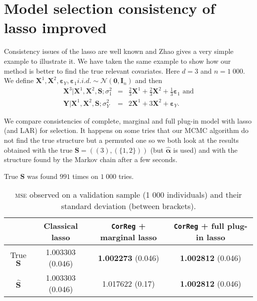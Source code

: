 \documentclass[12pt,a4paper]{report}
\begin{document}
	\section{Model selection consistency of {\sc lasso} improved}\label{consistency}
		Consistency issues of the {\sc lasso} are well known and Zhao \cite{Zhao2006MSC} gives a very simple example to illustrate it.
		We have taken the same example to show how our method is better to find the true relevant covariates.
		Here $d=3$ and $n=1\;000$.\\
		We define $\boldsymbol{X}^1,\boldsymbol{X}^2, \boldsymbol{\varepsilon}_Y, \boldsymbol{\varepsilon}_{1} i.i.d. \sim \mathcal{N}(\boldsymbol{0},\boldsymbol{I}_n)$ and then \\
		\begin{eqnarray}
		\boldsymbol{X}^3|\boldsymbol{X}^1,\boldsymbol{X}^2,\boldsymbol{S};\sigma_1^2&=&\frac{2}{3}\boldsymbol{X}^1+\frac{2}{3}\boldsymbol{X}^2+\frac{1}{3}\boldsymbol{\varepsilon}_1 \textrm{ and}  \nonumber \\
		\boldsymbol{Y}|\boldsymbol{X}^1,\boldsymbol{X}^2,\boldsymbol{S};\sigma_Y^2&=&2\boldsymbol{X}^1+3\boldsymbol{X}^2+\boldsymbol{\varepsilon}_Y. \nonumber 
		\end{eqnarray}
		
		
		We compare consistencies of complete, marginal and full plug-in model with {\sc lasso} (and LAR) for selection.
		It happens on some tries that our MCMC algorithm do not find the true structure but a permuted one so we both look at the results obtained with the true $\boldsymbol{S}=((3),(\{1,2\}))$ (but $\hat{\boldsymbol{\alpha}}$ is used) and with the structure found by the Markov chain after a few seconds.
		
		True $\boldsymbol{S}$ was found $991$ times on $1\;000$ tries.%
		
		\begin{table}[h!]
		\centering
		\begin{tabular}{|c|c|c|c|}
		\hline 
		 & Classical {\sc lasso} & {\tt CorReg} + marginal {\sc lasso}& {\tt CorReg} + full plug-in {\sc lasso}\\ 
		\hline 
		True $\boldsymbol{S}$ &  1.003303 (0.046) & \textbf{1.002273} (0.046)& \textbf{1.002812} (0.046)\\ 
		\hline 
		$\hat{\boldsymbol{S}}$ & 1.003303 (0.046)& 1.017622 (0.17)& \textbf{1.002812} (0.046)\\ 
		\hline 
		\end{tabular} 
		\caption{\textsc{mse} observed on a validation sample (1 000 individuals) and their standard deviation (between brackets).}\label{MSEconsistlasso}
		\end{table}
\end{document}
